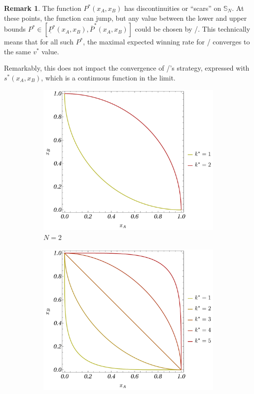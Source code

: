 \documentclass{article}
\theoremstyle{definition}
\newtheorem*{remark}{Remark}
\begin{document}
\begin{remark}
    The function $P^*(x_A,x_B)$ has discontinuities or ``scars'' on $\mathbb{S}_N$. At these points, the function can jump, but any value between the lower and upper bounds $P^* \in [\underline{P}^*(x_A,x_B), \overline{P}^*(x_A,x_B)]$ could be chosen by \PII/. This technically means that for all such $P^*$, the maximal expected winning rate for \PI/ converges to the same $v^*$ value.
    
    Remarkably, this does not impact the convergence of \PI/'s strategy, expressed with $s^*(x_A,x_B)$, which is a continuous function in the limit.

\begin{figure}[H]
    \centering
    \begin{subfigure}[b]{0.4\textwidth}
        \includegraphics[width=\textwidth]{img/Scars_2.pdf}
        \caption{$N=2$}
        \label{fig:Scars_2}
    \end{subfigure}
    \hspace{0.05\textwidth} %
    \begin{subfigure}[b]{0.4\textwidth}
        \includegraphics[width=\textwidth]{img/Scars_5.pdf}

\end{subfigure}
\end{figure}
\end{remark}
\end{document}

